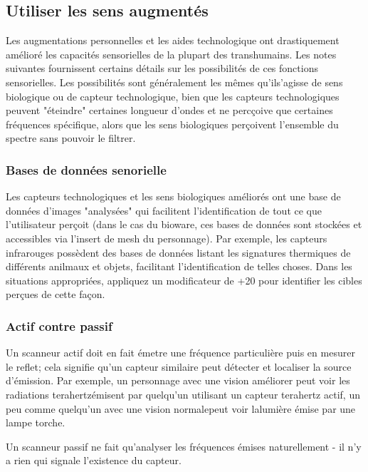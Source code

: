 \subsection{Utiliser les sens augmentés} \label{sec:using-enhanced-senses} 

Les augmentations personnelles et les aides technologique ont drastiquement amélioré les capacités sensorielles de la plupart des transhumains. Les notes suivantes fournissent certains détails sur les possibilités de ces fonctions sensorielles. Les possibilités sont généralement les mêmes qu'ils'agisse de sens biologique ou de capteur technologique, bien que les capteurs technologiques peuvent "éteindre" certaines longueur d'ondes et ne percçoive que certaines fréquences spécifique, alors que les sens biologiques perçoivent l'ensemble du spectre sans pouvoir le filtrer. 

\subsubsection{Bases de données senorielle} 

Les capteurs technologiques et les sens biologiques améliorés ont une base de données d'images "analysées" qui facilitent l'identification de tout ce que l'utilisateur perçoit (dans le cas du bioware, ces bases de données sont stockées et accessibles via l'insert de mesh du personnage). Par exemple, les capteurs infrarouges possèdent des bases de données listant les signatures thermiques de différents anilmaux et objets, facilitant l'identification de telles choses. Dans les situations appropriées, appliquez un modificateur de +20 pour identifier les cibles perçues de cette façon. 

\subsubsection{Actif contre passif} 

Un scanneur actif doit en fait émetre une fréquence particulière puis en mesurer le reflet; cela signifie qu'un capteur similaire peut détecter et localiser la source d'émission. Par exemple, un personnage avec une vision améliorer peut voir les radiations terahertzémisent par quelqu'un utilisant un capteur terahertz actif, un peu comme quelqu'un avec une vision normalepeut voir lalumière émise par une lampe torche. 

Un scanneur passif ne fait qu'analyser les fréquences émises naturellement - il n'y a rien qui signale l'existence du capteur. 

